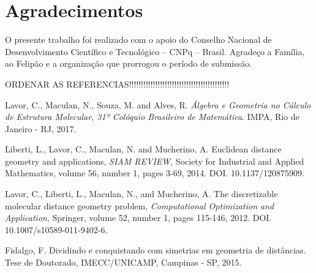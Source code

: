 \documentclass[a4,11pt]{pssbmac}
\begin{document}
	
	\section*{Agradecimentos}
	O presente trabalho foi realizado com o apoio do Conselho Nacional de Desenvolvimento Científico e Tecnológico – CNPq – Brasil. Agradeço a Família, ao Felipão e a organização que prorrogou o período de submissão.
	
	
	ORDENAR AS REFERENCIAS!!!!!!!!!!!!!!!!!!!!!!!!!!!!!!!!!!!!!!!!!!
	
	\begin{thebibliography}{00}
		
		Lavor, C., Maculan, N., Souza, M. and Alves, R. {\it Álgebra e Geometria no Cálculo de Estrutura Molecular, 31º Colóquio Brasileiro de Matemática}. IMPA, Rio de Janeiro - RJ, 2017.
		
		Liberti, L., Lavor, C., Maculan, N. and Mucherino, A. Euclidean distance geometry and applications, {\it SIAM REVIEW}, Society for Industrial and Applied Mathematics,  volume 56, number 1, pages 3-69, 2014. DOI. 10.1137/120875909.
		
		Lavor, C., Liberti, L., Maculan, N., and Mucherino, A. The discretizable molecular distance geometry problem, {\it Computational Optimization and Application}, Springer,  volume 52, number 1, pages 115-146, 2012. DOI. 10.1007/s10589-011-9402-6.
		
		Fidalgo, F. Dividindo e conquistando com simetrias em geometria de distâncias. Tese de Doutorado, IMECC/UNICAMP, Campinas - SP, 2015.
		
		
		

\end{thebibliography}
\end{document}
